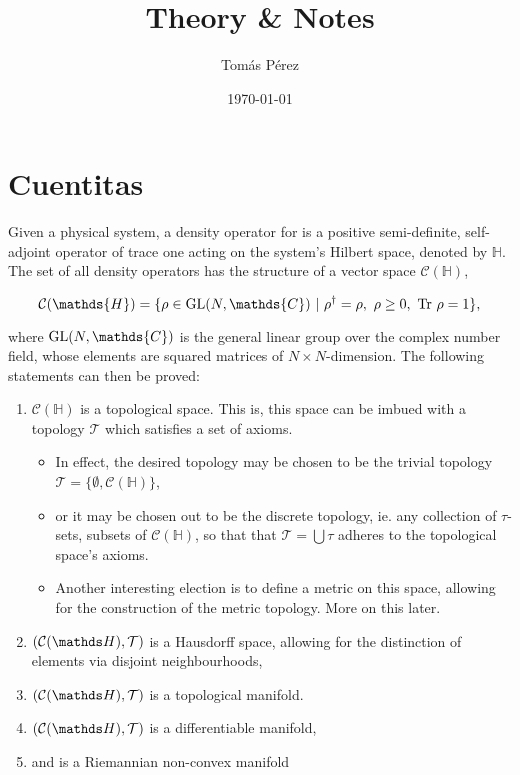 \documentclass{homework}
\author{Tomás Pérez}
\date{\today}
\title{Theory \& Notes}
\begin{document}
 \maketitle

\section{Cuentitas}

Given a physical system, a density operator for is a positive semi-definite, self-adjoint operator of trace one acting on the system's Hilbert space, denoted by $\mathds{H}$. The set of all density operators has the structure of a vector space $\mathcal{C}(\mathds{H})$,

$$
\mathcal{C}(\mathds{H}) = \{ \rho \in \textnormal{GL}(N, \mathds{C}) \blanky | \blanky \rho^\dagger = \rho, \blanky \rho \geq 0, \blanky \textnormal{Tr } \rho = 1 \},
$$

where $\textnormal{GL}(N, \mathds{C})$ is the general linear group over the complex number field, whose elements are squared matrices of $N \times N$-dimension. The following statements can then be proved:

\begin{enumerate}
    \item $\mathcal{C}(\mathds{H})$ is a topological space. This is, this space can be imbued with a topology $\mathcal{T}$ which satisfies a set of axioms. 
    \begin{itemize}
        \item In effect, the desired topology may be chosen to be the trivial topology $\mathcal{T} = \{\emptyset, \mathcal{C}(\mathds{H})\}$,
        \item or it may be chosen out to be the discrete topology, ie. any collection of $\tau$-sets, subsets of $\mathcal{C}(\mathds{H})$, so that that $\mathcal{T} = \bigcup \tau$ adheres to the topological space's axioms. 
        \item Another interesting election is to define a metric on this space, allowing for the construction of the metric topology. More on this later.   
    \end{itemize}
    \item $\topospace$ is a Hausdorff space, allowing for the distinction of elements via disjoint neighbourhoods, 
    \item $\topospace$ is a topological manifold. \item $\topospace$ is a differentiable manifold,
    \item and is a Riemannian non-convex manifold
\end{enumerate}
\end{document}
